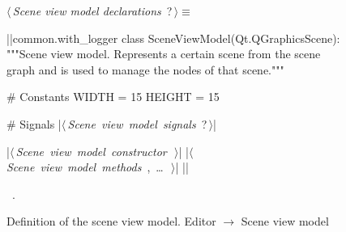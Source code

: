\documentclass[%
    a4paper,    %
    justified,  %
    nobib,      %
    openany     %
]{tufte-book}
\begin{document}
\begin{figure}
\begin{flushleft} \small
\begin{minipage}{\linewidth}\label{scrap89}\raggedright\small
{} $\langle\,${\itshape Scene view model declarations}\nobreak\ {\footnotesize {?}}$\,\rangle\equiv$
\vspace{-1ex}
\begin{pythoncode}
|\normalfont{}\fontfamily{}|common.with_logger
class SceneViewModel(Qt.QGraphicsScene):
    """Scene view model.
    Represents a certain scene from the scene graph and is used to manage the
    nodes of that scene."""

    # Constants
    WIDTH = 15
    HEIGHT = 15

    # Signals
    |\hbox{$\langle\,${\itshape Scene view model signals}\nobreak\ {\footnotesize ?}$\,\rangle$}|

    |\hbox{$\langle\,${\itshape Scene view model constructor}\nobreak\ {\footnotesize {}}$\,\rangle$}|
    |\hbox{$\langle\,${\itshape Scene view model methods}\nobreak\ {\footnotesize {}, \ldots\ }$\,\rangle$}|
|\NWsep|
\end{pythoncode}
\vspace{1.5ex}
\footnotesize
\begin{list}{}{\setlength{\itemsep}{-\parsep}\setlength{\itemindent}{-\leftmargin}}
\item \NWtxtMacroRefIn\ .

\item{}
\end{list}
\end{minipage}\vspace{4ex}
\end{flushleft}
\caption{Definition of the scene view model.
  \newline{}\newline{}Editor $\rightarrow$ Scene view model}
\label{editor:lst:scene-view-model}
\end{figure}
\end{document}
